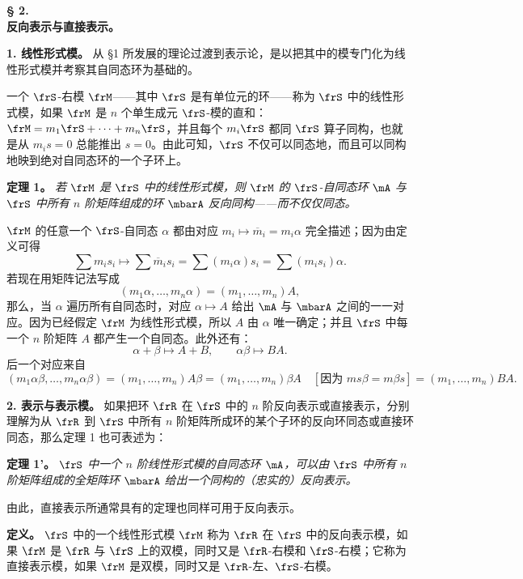 \begin{center}
\textbf{§ 2.}\\[0.4em]
\textbf{反向表示与直接表示。}
\end{center}

\noindent\textbf{1. 线性形式模。} 从 §1 所发展的理论过渡到表示论，是以把其中的模专门化为线性形式模并考察其自同态环为基础的。

一个 \(\frS\)-右模 \(\frM\)——其中 \(\frS\) 是有单位元的环——称为 \(\frS\) 中的线性形式模，如果 \(\frM\) 是 \(n\) 个单生成元 \(\frS\)-模的直和：\(\frM=m_1\frS+\cdots+m_n\frS\)，并且每个 \(m_i\frS\) 都同 \(\frS\) 算子同构，也就是从 \(m_i s=0\) 总能推出 \(s=0\)。由此可知，\(\frS\) 不仅可以同态地，而且可以同构地映到绝对自同态环的一个子环上。

\noindent\textbf{定理 1。} \emph{若 \(\frM\) 是 \(\frS\) 中的线性形式模，则 \(\frM\) 的 \(\frS\)-自同态环 \(\mA\) 与 \(\frS\) 中所有 \(n\) 阶矩阵组成的环 \(\mbarA\) 反向同构——而不仅仅同态。}

\(\frM\) 的任意一个 \(\frS\)-自同态 \(\alpha\) 都由对应 \(m_i\longmapsto \overline m_i=m_i\alpha\) 完全描述；因为由定义可得
\[
        \sum m_i s_i\longmapsto
        \sum \overline m_i s_i
        =\sum (m_i\alpha)s_i
        =\sum (m_i s_i)\alpha.
\]
若现在用矩阵记法写成
\[
        (m_1\alpha,\ldots,m_n\alpha)=(m_1,\ldots,m_n)A,
\]
那么，当 \(\alpha\) 遍历所有自同态时，对应 \(\alpha\mapsto A\) 给出 \(\mA\) 与 \(\mbarA\) 之间的一一对应。因为已经假定 \(\frM\) 为线性形式模，所以 \(A\) 由 \(\alpha\) 唯一确定；并且 \(\frS\) 中每一个 \(n\) 阶矩阵 \(A\) 都产生一个自同态。此外还有：
\[
        \alpha+\beta\mapsto A+B,\qquad
        \alpha\beta\mapsto BA.
\]
后一个对应来自
\[
        (m_1\alpha\beta,\ldots,m_n\alpha\beta)
        =(m_1,\ldots,m_n)A\beta
        =(m_1,\ldots,m_n)\beta A
        \quad[\text{因为 }m s\beta=m\beta s]
        =(m_1,\ldots,m_n)BA.
\]

\noindent\textbf{2. 表示与表示模。} 如果把环 \(\frR\) 在 \(\frS\) 中的 \(n\) 阶反向表示或直接表示，分别理解为从 \(\frR\) 到 \(\frS\) 中所有 \(n\) 阶矩阵所成环的某个子环的反向环同态或直接环同态，那么定理 1 也可表述为：

\noindent\textbf{定理 1'。} \emph{\(\frS\) 中一个 \(n\) 阶线性形式模的自同态环 \(\mA\)，可以由 \(\frS\) 中所有 \(n\) 阶矩阵组成的全矩阵环 \(\mbarA\) 给出一个同构的（忠实的）反向表示。}

由此，直接表示所通常具有的定理也同样可用于反向表示。

\noindent\textbf{定义。} \(\frS\) 中的一个线性形式模 \(\frM\) 称为 \(\frR\) 在 \(\frS\) 中的反向表示模，如果 \(\frM\) 是 \(\frR\) 与 \(\frS\) 上的双模，同时又是 \(\frR\)-右模和 \(\frS\)-右模；它称为直接表示模，如果 \(\frM\) 是双模，同时又是 \(\frR\)-左、\(\frS\)-右模。

